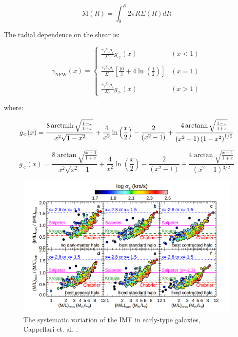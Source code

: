 \begin{appendices}
\begin{equation}
\text{M}(R)=\int_{0}^{R}2\pi R\Sigma(R)dR
\end{equation}

The radial dependence on the shear is:

\begin{equation}
\gamma_{\text{NFW}}(x) = \left\lbrace
\begin{array}{lll}
\frac{r_{s}\delta_{c}\rho_{c}}{\Sigma_c}g_{<}(x) & (x<1)\\\\
\frac{r_{s}\delta_{c}\rho_{c}}{\Sigma_c}\left[\frac{10}{3}+4 \ln \left(\frac{1}{2}\right)\right] & (x=1)\\\\
\frac{r_{s}\delta_{c}\rho_{c}}{\Sigma_c}g_{>}(x) & (x>1)
\end{array}
\right.
\end{equation} 

where: 

\begin{equation}
g_{<}(x)=\frac{8 \operatorname{arctanh} \sqrt{\frac{1-x}{1+x}}}{x^{2}\sqrt{1-x^{2}}}+\frac{4}{x^{2}} \ln \left(\frac{x}{2}\right)-\frac{2}{\left(x^{2}-1\right)}+\frac{4 \operatorname{arctanh} \sqrt{\frac{1-x}{1+x}}}{\left(x^{2}-1\right)\left(1-x^{2}\right)^{1/2}}
\end{equation}

\begin{equation}
g_{<}(x)=\frac{8 \arctan \sqrt{\frac{x-1}{1+x}}}{x^{2}\sqrt{x^{2}-1}}+\frac{4}{x^{2}}\ln \left(\frac{x}{2}\right)-\frac{2}{\left(x^{2}-1\right)}+\frac{4 \arctan \sqrt{\frac{x-1}{1+x}}}{\left(x^{2}-1\right){}^{3/2}}
\end{equation}  

\begin{figure}[H]
\centering
\includegraphics[width=12cm]{images/IMFs_paper.png}
\caption[The systematic variation of the IMF in early-type galaxies.]{The systematic variation of the IMF in early-type galaxies, Cappellari et. al. \citeyear{Reference19}.}
\end{figure}
 
\end{appendices}